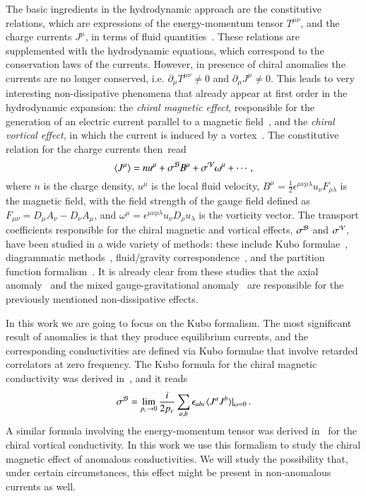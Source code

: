 \documentclass[epj]{webofc}
\begin{document}
The basic ingredients in the hydrodynamic approach are the constitutive relations, which are expressions of the energy-momentum tensor $T^{\mu\nu}$, and the charge currents $J^\mu$, in terms of fluid quantities~\cite{Kovtun:2012rj}. These relations are supplemented with the hydrodynamic equations, which correspond to the conservation laws of the currents. However, in presence of chiral anomalies the currents are no longer conserved, i.e. $\partial_\mu T^{\mu\nu} \ne 0$ and $\partial_\mu J^\mu \ne 0$. This leads to very interesting non-dissipative phenomena that already appear at first order in the hydrodynamic expansion: the {\it chiral magnetic effect}, responsible for the generation of an electric current parallel to a magnetic field~\cite{Fukushima:2008xe}, and the {\it chiral vortical effect}, in which the current is induced by a vortex~\cite{Son:2009tf}. The constitutive relation for the charge currents then~read
\begin{equation}
\langle J^\mu \rangle = n u^\mu + \sigma^{\cal B} B^\mu + \sigma^{\cal V}\omega^\mu + \cdots \,,
\end{equation}
where $n$ is the charge density, $u^\mu$ is the local fluid velocity, $B^\mu = \frac{1}{2}\epsilon^{\mu\nu\rho\lambda} u_\nu F_{\rho\lambda}$ is the magnetic field, with the field strength of the gauge field defined as $F_{\mu\nu} = D_\mu A_\nu - D_\nu A_\mu$, and  $\omega^\mu = \epsilon^{\mu\nu\rho\lambda}u_\nu D_\rho u_\lambda$ is the vorticity vector. The transport coefficients responsible for the chiral magnetic and vortical effects, $\sigma^{\cal B}$ and $\sigma^{\cal V}$, have been studied in a wide variety of methods: these include Kubo formulae~\cite{Amado:2011zx,Landsteiner:2012kd,Chowdhury:2015pba}, diagrammatic methods~\cite{Manes:2012hf}, fluid/gravity correspondence~\cite{Bhattacharyya:2008jc,Erdmenger:2008rm,Banerjee:2008th,Megias:2013joa}, and the partition function formalism~\cite{Banerjee:2012iz,Jensen:2012jy,Jensen:2012jh,Megias:2014mba}. It is already clear from these studies that the axial anomaly~\cite{Kharzeev:2009pj} and the mixed gauge-gravitational anomaly~\cite{Landsteiner:2011cp} are responsible for the previously mentioned non-dissipative effects. 

In this work we are going to focus on the Kubo formalism. The most significant result of anomalies is that they produce equilibrium currents, and the corresponding conductivities are defined via Kubo formulae that involve retarded correlators at zero frequency. The Kubo formula for the chiral magnetic conductivity was derived in~\cite{Kharzeev:2009pj}, and it reads
\begin{equation}
\sigma^{\cal B} = \lim_{p_c\rightarrow 0} \frac{i}{2p_c} \sum_{a,b}\epsilon_{abc}
\langle J^a J^b \rangle|_{\omega=0}  \,. \label{eq:Kubo}
\end{equation}
A similar formula involving the energy-momentum tensor was derived in~\cite{Amado:2011zx} for the chiral vortical conductivity.  In this work we use this formalism to study the chiral magnetic effect of anomalous conductivities. We will study the possibility that, under certain circumstances, this effect might be present in non-anomalous currents as well.
\end{document}
